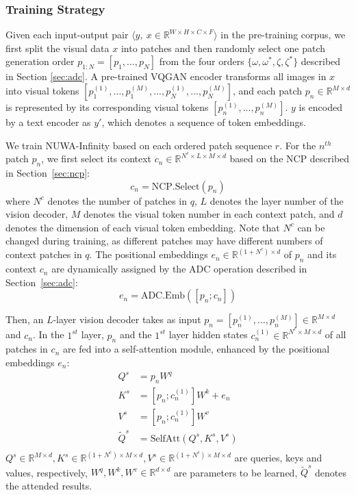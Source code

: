 \documentclass{article}
\begin{document}
\subsubsection{Training Strategy}\label{sec:ts}

Given each input-output pair $\langle y,~x\in \mathbb{R}^{W\times H\times C\times F} \rangle$ in the pre-training corpus, we first split the visual data $x$ into patches and then randomly select one patch generation order $p_{1:N}=[p_1,...,p_N]$ from the four orders $\{\omega, \omega^*, \zeta, \zeta^*\}$ described in Section  \ref{sec:adc}. A pre-trained VQGAN encoder \cite{esserTamingTransformersHighResolution2021} transforms all images in $x$ into visual tokens $[p_1^{(1)},...,p_1^{(M)},...,p_N^{(1)},...,p_N^{(M)}]$, and each patch $p_n\in \mathbb{R}^{M\times d}$ is represented by its corresponding visual tokens $[p_n^{(1)},...,p_n^{(M)}]$. $y$ is encoded by a text encoder as $y'$, which denotes a sequence of token embeddings.



We train NUWA-Infinity based on each ordered patch sequence $r$. For the $n^{th}$ patch $p_n$, we first select its context $c_n\in \mathbb{R}^{N^c\times L \times M\times d}$ based on the NCP described in Section~\ref{sec:ncp}:
\begin{equation}\label{eq:x'}
c_n=\text{NCP}.\text{Select}(p_n)
\end{equation}
where $N^c$ denotes the number of patches in $q$, $L$ denotes the layer number of the vision decoder, $M$ denotes the visual token number in each context patch, and $d$ denotes the dimension of each visual token embedding. Note that $N^c$ can be changed during training, as different patches may have different numbers of context patches in $q$. The positional embeddings $e_n\in \mathbb{R}^{(1+N^c)\times d}$ of $p_n$ and its context $c_n$ are dynamically assigned by the ADC operation described in Section~\ref{sec:adc}:
\begin{equation}\label{eq:en}
e_n=\text{ADC.Emb}([p_n; c_n])
\end{equation}

Then, an $L$-layer vision decoder takes as input $p_n=[p_n^{(1)},...,p_n^{(M)}] \in \mathbb{R}^{M\times d}$ and $c_n$. In the $1^{st}$ layer, $p_n$ and the $1^{st}$ layer hidden states $c_n^{(1)}\in \mathbb{R}^{N^c\times M\times d}$ of all patches in $c_n$ are fed into a self-attention module, enhanced by the positional embeddings $e_n$:
\begin{equation}\label{eq:qkv}
\begin{split}
Q^s&=p_nW^q\\
K^s&=[p_n;c_n^{(1)}]W^k+e_n\\
V^s&=[p_n;c_n^{(1)}]W^v\\
\tilde{Q}^s&=\text{SelfAtt}(Q^s, K^s, V^s)  \\
\end{split}
\end{equation} 
$Q^s\in \mathbb{R}^{M\times d}, K^s\in \mathbb{R}^{(1+N^c)\times M\times d}, V^s\in \mathbb{R}^{(1+N^c)\times M\times d}$ are queries, keys and values, respectively, $W^q, W^k, W^v\in \mathbb{R}^{d\times d}$ are parameters to be learned, $\tilde{Q}^s$ denotes the attended results.
\end{document}
